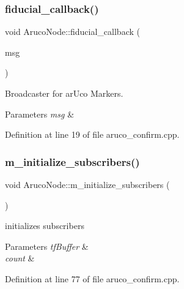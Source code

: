 \subsubsection{\texorpdfstring{fiducial\+\_\+callback()}{fiducial\_callback()}}
{\footnotesize\ttfamily void Aruco\+Node\+::fiducial\+\_\+callback (\begin{DoxyParamCaption}\item[{const fiducial\+\_\+msgs\+::\+Fiducial\+Transform\+Array\+::\+Const\+Ptr \&}]{msg }\end{DoxyParamCaption})}



Broadcaster for ar\+Uco Markers. 


\begin{DoxyParams}{Parameters}
{\em msg} & \\
\hline
\end{DoxyParams}


Definition at line 19 of file aruco\+\_\+confirm.\+cpp.

\mbox{\label{class_aruco_node_a3aa9013d9f53f08c7de83be3359f7503}} 
\subsubsection{\texorpdfstring{m\+\_\+initialize\+\_\+subscribers()}{m\_initialize\_subscribers()}}
{\footnotesize\ttfamily void Aruco\+Node\+::m\+\_\+initialize\+\_\+subscribers (\begin{DoxyParamCaption}{ }\end{DoxyParamCaption})}



initializes subscribers 


\begin{DoxyParams}{Parameters}
{\em tf\+Buffer} & \\
\hline
{\em count} & \\
\hline
\end{DoxyParams}


Definition at line 77 of file aruco\+\_\+confirm.\+cpp.

\mbox{\label{class_aruco_node_ad79fd951057c9a40f34fc159363fbd94}} 
